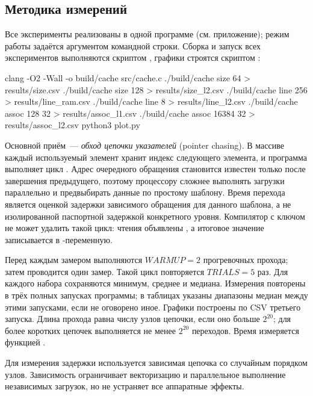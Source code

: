 \subsection{Методика измерений}

Все эксперименты реализованы в одной программе  (см. приложение); режим работы задаётся аргументом командной строки. Сборка и запуск всех экспериментов выполняются скриптом , графики строятся скриптом :
\begin{cmd}
clang -O2 -Wall -o build/cache src/cache.c
./build/cache size 64            > results/size.csv
./build/cache size 128           > results/size_l2.csv
./build/cache line 256           > results/line_ram.csv
./build/cache line 8             > results/line_l2.csv
./build/cache assoc 128 32       > results/assoc_l1.csv
./build/cache assoc 16384 32     > results/assoc_l2.csv
python3 plot.py
\end{cmd}

Основной приём~--- \emph{обход цепочки указателей} (pointer chasing). В массиве каждый используемый элемент хранит индекс следующего элемента, и программа выполняет цикл . Адрес очередного обращения становится известен только после завершения предыдущего, поэтому процессору сложнее выполнять загрузки параллельно и предвыбирать данные по простому шаблону. Время перехода является оценкой задержки зависимого обращения для данного шаблона, а не изолированной паспортной задержкой конкретного уровня. Компилятор с ключом  не может удалить такой цикл: чтения объявлены , а итоговое значение записывается в -переменную.

Перед каждым замером выполняются $WARMUP=2$ прогревочных прохода; затем проводится один замер. Такой цикл повторяется $TRIALS=5$ раз. Для каждого набора сохраняются минимум, среднее и медиана. Измерения повторены в трёх полных запусках программы; в таблицах указаны диапазоны медиан между этими запусками, если не оговорено иное. Графики построены по CSV третьего запуска. Длина прохода равна числу узлов цепочки, если оно больше $2^{20}$; для более коротких цепочек выполняется не менее $2^{20}$ переходов. Время измеряется функцией .

Для измерения задержки используется зависимая цепочка со случайным порядком узлов. Зависимость ограничивает векторизацию и параллельное выполнение независимых загрузок, но не устраняет все аппаратные эффекты.

